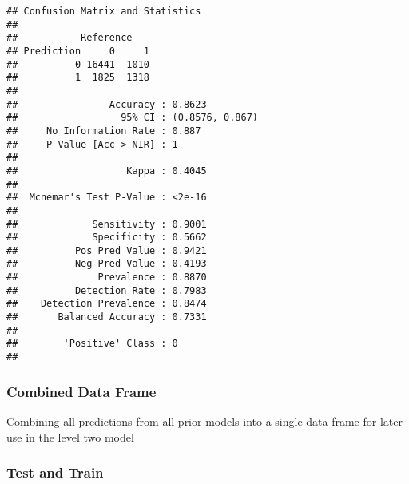 \documentclass[
]{article}
\newenvironment{Shaded}{\begin{snugshade}}{\end{snugshade}}
\newcommand{\AttributeTok}[1]{\textcolor[rgb]{0.77,0.63,0.00}{#1}}
\newcommand{\FunctionTok}[1]{\textcolor[rgb]{0.00,0.00,0.00}{#1}}
\newcommand{\NormalTok}[1]{#1}
\newcommand{\OtherTok}[1]{\textcolor[rgb]{0.56,0.35,0.01}{#1}}
\newcommand{\SpecialCharTok}[1]{\textcolor[rgb]{0.00,0.00,0.00}{#1}}
\begin{document}
\begin{verbatim}
## Confusion Matrix and Statistics
## 
##           Reference
## Prediction     0     1
##          0 16441  1010
##          1  1825  1318
##                                          
##                Accuracy : 0.8623         
##                  95% CI : (0.8576, 0.867)
##     No Information Rate : 0.887          
##     P-Value [Acc > NIR] : 1              
##                                          
##                   Kappa : 0.4045         
##                                          
##  Mcnemar's Test P-Value : <2e-16         
##                                          
##             Sensitivity : 0.9001         
##             Specificity : 0.5662         
##          Pos Pred Value : 0.9421         
##          Neg Pred Value : 0.4193         
##              Prevalence : 0.8870         
##          Detection Rate : 0.7983         
##    Detection Prevalence : 0.8474         
##       Balanced Accuracy : 0.7331         
##                                          
##        'Positive' Class : 0              
## 
\end{verbatim}

\hypertarget{combined-data-frame}{%
\subsubsection{Combined Data Frame}\label{combined-data-frame}}

Combining all predictions from all prior models into a single data frame
for later use in the level two model

\begin{Shaded}
\end{Shaded}

\hypertarget{test-and-train}{%
\subsubsection{Test and Train}\label{test-and-train}}
\end{document}
